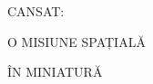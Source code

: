 \begin{frame}[plain]
    \vspace*{5cm}  %
    \begin{flushleft}
        \hspace*{1cm}  %
        {\fontsize{32}{36}\selectfont\textcolor{mainblue}{\textlatin{CANSAT: }}\par}
        \hspace*{1cm}  %
        {\fontsize{32}{36}\selectfont\textcolor{mainblue}{\textlatin{O MISIUNE SPAȚIALĂ}}\par}
        \hspace*{1cm}  %
        {\fontsize{32}{36}\selectfont\textcolor{mainblue}{\textlatin{ÎN MINIATURĂ}}\par}
    \end{flushleft}
\end{frame}